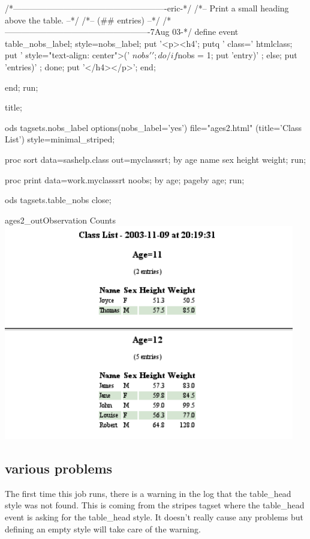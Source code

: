 \begin{sfvcode}
        /*-------------------------------------------------------eric-*/
        /*-- Print a small heading above the table.                 --*/
        /*-- (## entries)                                           --*/
        /*----------------------------------------------------7Aug 03-*/
        define event table_nobs_label;
            style=nobs_label;
            put '<p><h4';
            putq ' class=' htmlclass; 
            put ' style="text-align: center">(' $nobs ' ';
            do /if $nobs = 1; 
                put 'entry)' ;
            else;
                put 'entries)' ;
            done;
            put '</h4></p>';
        end;
        
    end;
run;

title;


ods tagsets.nobs_label options(nobs_label='yes') 
    file="ages2.html" (title='Class List')
    style=minimal_striped;

proc sort data=sashelp.class out=myclasssrt;
    by age name sex height weight;
run;

proc print data=work.myclasssrt noobs;
    by age;
    pageby age;
run;

ods tagsets.table_nobs close;
\end{sfvcode}

\begin{goutput}{ages2_out}{Observation Counts}
\includegraphics[width=5in]{ages2.png}
\end{goutput}

\subsection{various problems}
The first time this job runs, there is a warning in the log that the table\_head style
was not found.  This is coming from the stripes tagset where the table\_head event
is asking for the table\_head style.  It doesn't really cause any problems but defining
an empty style will take care of the warning.

